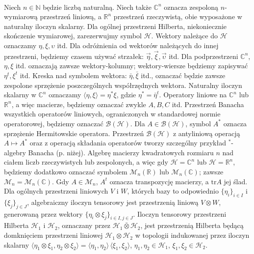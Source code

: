 \paragraph{}
Niech $n \in \mathbb{N}$ będzie liczbą naturalną.
Niech także $\mathbb{C}^{n}$ oznacza zespoloną $n$-wymiarową przestrzeń liniową,
a $\mathbb{R}^{n}$ przestrzeń rzeczywistą,
obie wyposażone w naturalny iloczyn skalarny.
Dla ogólnej przestrzeni Hilberta,
niekoniecznie skończenie wymiarowej,
zarezerwujmy symbol $\mathcal{H}$.
Wektory należące do $\mathcal{H}$ oznaczamy
$\eta, \xi, \upsilon$ itd.
Dla odróżnienia od wektorów należących do innej przestrzeni,
będziemy czasem używać strzałek: $\vec{\eta}, \vec{\xi}, \vec{\upsilon}$ itd.
Dla podprzestrzeni $\mathbb{C}^{n}$,
$\eta, \xi$ itd. oznaczają zawsze wektory-kolumny;
wektory-wiersze będziemy zapisywać
$\eta^{t}, \xi^{t}$ itd.
Kreska nad symbolem wektora: $\bar{\eta}, \bar{\xi}$ itd.,
oznaczać będzie zawsze zespolone sprzężenie poszczególnych współrzędnych wektora.
Naturalny iloczyn skalarny w $\mathbb{C}^{n}$ oznaczamy
$\langle \eta , \xi \rangle = \eta^{*} \xi$,
gdzie $\eta^{*} = \bar{\eta}^{t}$.
Operatory liniowe na $\mathbb{C}^{n}$ lub $\mathbb{R}^{n}$,
a więc macierze,
będziemy oznaczać zwykle $A, B, C$ itd.
Przestrzeń Banacha wszystkich operatorów liniowych,
ograniczonych w standardowej normie operatorowej,
będziemy oznaczać $\mathcal{B}(\mathcal{H})$.
Dla $A \in \mathcal{B}(\mathcal{H})$,
symbol $A^{*}$ oznacza sprzężenie Hermitowskie operatora.
Przestrzeń $\mathcal{B}(\mathcal{H})$ z antyliniową operacją
$A \mapsto A^{*}$ oraz z operacją składania operatorów
tworzy szczególny przykład \mbox{$^{*}$-algebry} Banacha (p. niżej).
Algebrę macierzy kwadratowych rozmiaru $n$ nad ciałem liczb
rzeczywistych lub zespolonych,
a więc gdy $\mathcal{H} = \mathbb{C}^{n}$ lub
$\mathcal{H} = \mathbb{R}^{n}$,
będziemy dodatkowo oznaczać symbolem $\mathcal{M}_{n}(\mathbb{R})$ lub
$\mathcal{M}_{n}(\mathbb{C})$;
zawsze $\mathcal{M}_{n} = \mathcal{M}_{n}(\mathbb{C})$.
Gdy $A \in \mathcal{M}_{n}$,
$A^{t}$ oznacza transpozycję macierzy,
a $\text{tr} A$ jej ślad.
Dla ogólnych przestrzeni liniowych $V$ i $W$,
których bazy to odpowiednio
$\{ \eta_{i} \}_{i \in I}$ i
$\{ \xi_{j} \}_{j \in J}$,
algebraiczny iloczyn tensorowy
jest przestrzenią liniową $V \! \otimes \! W$, generowaną przez wektory
$\{\eta_{i} \otimes \xi_{j}\}_{i\in I, j \in J}$.
Iloczyn tensorowy przestrzeni Hilberta $\mathcal{H}_{1}$ i $\mathcal{H}_{2}$,
oznaczany przez $\mathcal{H}_{1} \bar{\otimes} \mathcal{H}_{2}$,
jest przestrzenią Hilberta będącą domknięciem przestrzeni liniowej
$\mathcal{H}_{1} \! \otimes \! \mathcal{H}_{2}$ w topologii indukowanej
przez iloczyn skalarny
$\langle \eta_{1} \otimes \xi_{1}, \eta_{2} \otimes \xi_{2} \rangle =
\langle \eta_{1} , \eta_{2} \rangle \, \langle \xi_{1}, \xi_{2} \rangle$,
$\eta_{1}, \eta_{2} \in \mathcal{H}_{1}$,
$\xi_{1}, \xi_{2} \in \mathcal{H}_{2}$.


